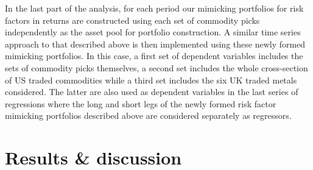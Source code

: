\documentclass[]{elsarticle} %
\begin{document}
In the last part of the analysis, for each period our mimicking
portfolios for risk factors in returns are constructed using each set of
commodity picks independently as the asset pool for portfolio
construction. A similar time series approach to that described above is
then implemented using these newly formed mimicking portfolios. In this
case, a first set of dependent variables includes the sets of commodity
picks themselves, a second set includes the whole cross-section of US
traded commodities while a third set includes the six UK traded metals
considered. The latter are also used as dependent variables in the last
series of regressions where the long and short legs of the newly formed
risk factor mimicking portfolios described above are considered
separately as regressors.

\hypertarget{results-discussion}{%
\section{Results \& discussion}\label{results-discussion}}
\end{document}
